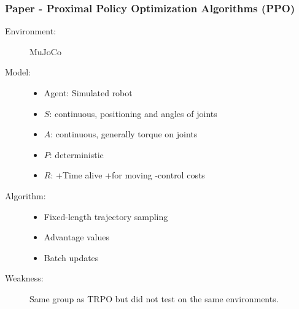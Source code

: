 \documentclass{beamer}
\begin{document}
\begin{frame} %
    \frametitle{Paper \thepapercounter - Proximal Policy Optimization Algorithms (PPO)%
    }
    \begin{description}
        \item[Environment:] MuJoCo 
        \item[Model:]
        \begin{itemize}
            \item Agent: Simulated robot
            \item $S$: continuous, positioning and angles of joints
            \item $A$: continuous, generally torque on joints
            \item $P$: deterministic
            \item $R$: +Time alive +for moving -control costs
        \end{itemize}
        \item[Algorithm:] 
        \begin{itemize}
            \item Fixed-length trajectory sampling
            \item Advantage values
            \item Batch updates
        \end{itemize}
        \item[Weakness:] Same group as TRPO but did not test on the same environments.
    \end{description}
\end{frame}
\end{document}
